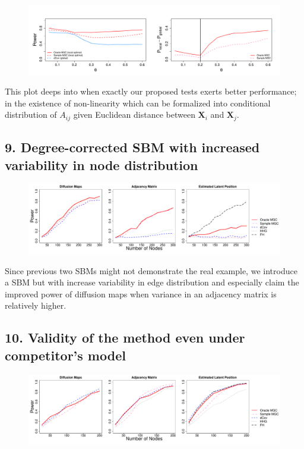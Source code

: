 \documentclass[12pt]{article}
\begin{document}
\begin{figure}[H]
	\centering
	\includegraphics[width=5in]{../Figure/powerplot.pdf}
	\label{fig:powerplot}
\end{figure}

This plot deeps into when exactly our proposed tests exerts better performance; in the existence of non-linearity which can be formalized into conditional distribution of $A_{ij}$ given Euclidean distance between $\mathbf{X}_{i}$ and $\mathbf{X}_{j}$.

\subsection*{9. Degree-corrected SBM with increased variability in node distribution}	

\begin{figure}[H]
	\centering
	\includegraphics[width=6in]{../Figure/dcSBM.pdf}
	\label{fig:dcSBM}
\end{figure}	

Since previous two SBMs might not demonstrate the real example, we introduce a SBM but with increase variability in edge distribution and especially claim the improved power of diffusion maps when variance in an adjacency matrix is relatively higher.



\subsection*{10. Validity of the method even under competitor's model}

\begin{figure}[H]
	\centering
	\includegraphics[width=6in]{../Figure/ame.pdf}
	\label{fig:ame}
\end{figure}	
\end{document}
